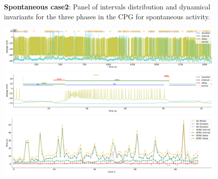 \begin{figure}[htbp]
\begin{minipage}{0.9\textwidth}
\begin{minipage}[b]{0.53\textwidth}
\begin{minipage}[b]{\textwidth}
			\end{minipage}
		\end{minipage}
	\end{minipage}
	\caption{\textbf{Spontaneous case2}: Panel of intervals distribution and dynamical invariants for the three phases in the CPG for spontaneous activity.}
	\label{fig:prep2 invariants}
\end{figure}


\begin{figure}[htbp]
	\centering
	\begin{minipage}[b]{\textwidth}
		\centering
		\includegraphics[width=\textwidth,height=0.1\textheight]{./invariants/data/SUSSEX/prep2/images/spontaneous_2phases_signal_intervals_zoom.pdf}
		\includegraphics[width=\textwidth]{./invariants/data/SUSSEX/prep2/images/spontaneous_2phases_signal_intervals_cycle.pdf}
		\includegraphics[width=\textwidth]{./invariants/data/SUSSEX/prep2/images/spontaneous_2phases_time_cycle.pdf}
	\end{minipage}
	\begin{minipage}{0.9\textwidth}
		\centering
		\begin{minipage}[b]{0.45\textwidth}
			\centering

\end{minipage}
\end{minipage}
\end{figure}
